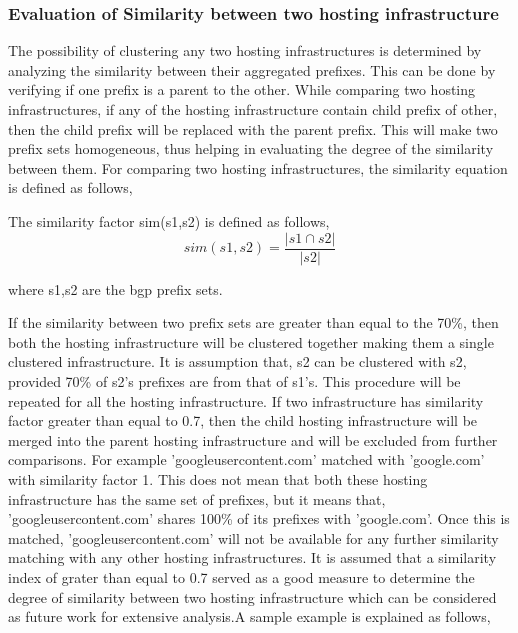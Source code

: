 \subsubsection{Evaluation of Similarity between two hosting infrastructure}
The possibility of clustering any two hosting infrastructures is determined by analyzing the similarity between their aggregated prefixes. This can be done by verifying if one prefix is a parent to the other. While comparing two hosting infrastructures, if any of the hosting infrastructure contain child prefix of other, then the child prefix will be replaced with the parent prefix. This will make two prefix sets homogeneous, thus helping in evaluating the degree of the similarity between them. For comparing two hosting infrastructures, the similarity equation is defined as follows,

The similarity factor sim(s1,s2) is defined as follows,
\begin{equation}
sim(s1, s2)= \frac{|s1 \cap s2|}{|s2|}
\end{equation}

where s1,s2 are the bgp prefix sets.

If the similarity between two prefix sets are greater than equal to the 70\%, then both the hosting infrastructure will be clustered together making them a single clustered infrastructure. It is assumption that, s2 can be clustered with s2, provided 70\% of s2's prefixes are from that of s1's. This procedure will be repeated for all the hosting infrastructure. If two infrastructure has similarity factor greater than equal to 0.7, then the child hosting infrastructure will be merged into the parent hosting infrastructure and will be excluded from further comparisons. For example ’googleusercontent.com’ matched with ’google.com’ with similarity factor 1. This does not mean that both these hosting infrastructure has the same set of prefixes, but it means that, ’googleusercontent.com’ shares 100\% of its prefixes with ’google.com’. Once this is matched, ’googleusercontent.com’ will not be available for any further similarity matching with any other hosting infrastructures. It is assumed that a similarity index of grater than equal to 0.7 served as a good measure to determine the degree of similarity between two hosting infrastructure which can be considered as future work for extensive analysis.A sample example is explained as follows,

\begin{center}
\end{center}

